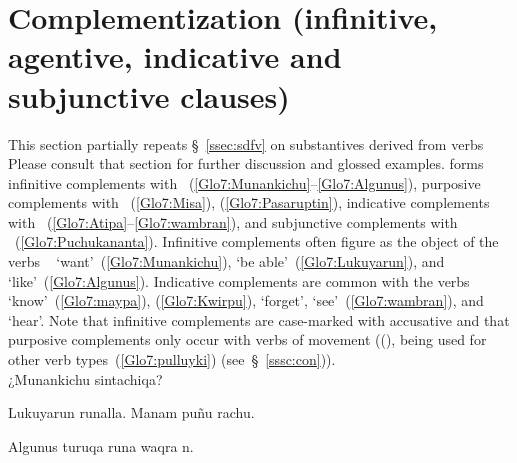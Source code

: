 \section{Complementization (infinitive, agentive, indicative and subjunctive clauses)}\label{sec:comple}
This section partially repeats §~\ref{ssec:sdfv} on substantives derived from verbs Please consult that section for further discussion and glossed examples. \SYQ{} forms infinitive complements with ~(\ref{Glo7:Munankichu}--\ref{Glo7:Algunus}), purposive complements with ~(\ref{Glo7:Misa}), (\ref{Glo7:Pasaruptin}), indicative complements with ~(\ref{Glo7:Atipa}--\ref{Glo7:wambran}), and subjunctive complements with ~(\ref{Glo7:Puchukananta}). Infinitive complements often figure as the object of the verbs ~ ‘want’~(\ref{Glo7:Munankichu}),  ‘be able’~(\ref{Glo7:Lukuyarun}), and  ‘like’~(\ref{Glo7:Algunus}). Indicative complements are common with the verbs  ‘know’~(\ref{Glo7:maypa}), (\ref{Glo7:Kwirpu}),  ‘forget’,  ‘see’~(\ref{Glo7:wambran}), and  ‘hear’. Note that infinitive complements are case-marked with accusative  and that  purposive complements only occur with verbs of movement ((), being used for other verb types~(\ref{Glo7:pulluyki}) (see~§~\ref{sssc:con})).\\

%
{¿Munankichu sintachiqa?}%
{}%
{}{}%

%
{Lukuyarun runalla. Manam puñu rachu.}%
{}%
{}{}%

%
{Algunus turuqa runa waqra n.}%
{}%
{}{}%

